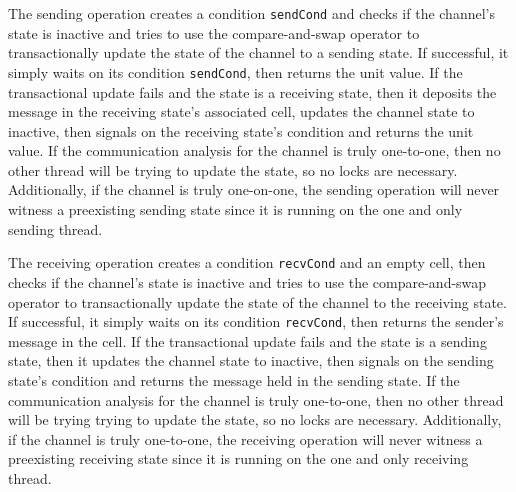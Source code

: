 \documentclass[letterpaper, 11pt]{report}
\begin{document}
The sending operation creates a condition \lstinline{sendCond} and checks
if the channel's state is inactive and tries to use the
compare-and-swap operator to transactionally update the state of the channel to a
sending state.
If successful, it simply waits on its condition \lstinline{sendCond}, then returns the unit value.
If the transactional update fails and the state is a receiving state,
then it deposits the message in the receiving state's associated cell,
updates the channel state to inactive, then signals on the receiving state's 
condition and returns the unit value.
If the communication analysis for the channel is
truly one-to-one, then no other thread will be trying to update the state, so no locks are necessary.
Additionally, if the channel is truly one-on-one, the sending operation will never
witness a preexisting sending state since it is running on the one and only sending thread. 

The receiving operation creates a condition \lstinline{recvCond} and an empty cell,
then checks if the channel's state is inactive and tries to use the
compare-and-swap operator to transactionally update the state of the channel to
the receiving state. If successful, it simply waits on its condition \lstinline{recvCond},
then returns the sender's message in the cell.
If the transactional update fails and the state is a sending state,
then it updates the channel state to inactive, then signals on the sending state's
condition and returns the message held in the sending state.
If the communication
analysis for the channel is truly one-to-one, then no other thread will be trying
trying to update the state, so no locks are necessary.
Additionally, if the channel is truly one-to-one, the receiving operation will never
witness a preexisting receiving state since it is running on the one and only receiving thread.
\end{document}
